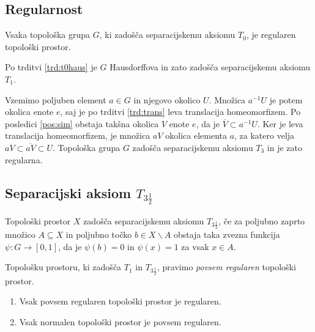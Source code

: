 \documentclass[mat1]{fmfdelo}
\newcommand{\closure}[1]{\overline{#1}}
\begin{document}
\subsection{Regularnost}

\begin{izrek}\label{izr:t3}
	Vsaka topološka grupa $G$, ki zadošča separacijskemu aksiomu $T_0$, je regularen topološki prostor.
\end{izrek}

\begin{dokaz}
	Po trditvi \ref{trd:t0haus} je $G$ Hausdorffova in zato zadošča separacijskemu aksiomu $T_1$.
	
	Vzemimo poljuben element $a \in G$ in njegovo okolico $U$. Množica $a^{-1}U$ je potem okolica enote $e$, saj je po trditvi \ref{trd:trans} leva translacija homeomorfizem. Po posledici \ref{pos:sim} obstaja takšna okolica $V$ enote $e$, da je $\closure{V} \subset a^{-1}U$. Ker je leva translacija homeomorfizem, je množica $aV$ okolica elementa $a$, za katero velja $aV \subset \closure{aV} \subset U$. Topološka grupa $G$ zadošča separacijskemu aksiomu $T_3$ in je zato regularna.
\end{dokaz}


\subsection{Separacijski aksiom $T_{3 \frac{1}{2}}$}

\begin{definicija}
	Topološki prostor $X$ zadošča separacijskemu aksiomu $T_{3 \frac{1}{2}}$, če za poljubno zaprto množico $A \subseteq X$ in poljubno točko $b \in X\backslash A$ obstaja taka zvezna funkcija $\psi\colon G \to [0, 1]$, da je $\psi (b) = 0$ in $\psi (x) = 1$ za vsak $x \in A$.
\end{definicija}

\begin{opomba}
	Topološku prostoru, ki zadošča $T_1$ in $T_{3 \frac{1}{2}}$, pravimo \emph{povsem regularen} topološki prostor.
\end{opomba}


\begin{trditev}\label{pos:reghaus}
\begin{enumerate}
\item Vsak povsem regularen topološki prostor je regularen.\label{podtrd:reghaus1}
\item Vsak normalen topološki prostor je povsem regularen.\label{podtrd:reghaus2}
\end{enumerate}
\end{trditev}
\end{document}
